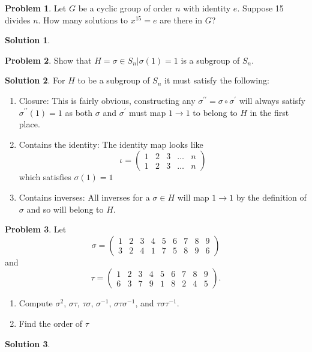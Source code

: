 \documentclass[10pt]{article}
\theoremstyle{definition}
\newtheorem{problem}{Problem}
\newtheorem{soln}{Solution}
\newcommand{\primed}[1]{#1^\prime}
\begin{document}
\begin{problem}
Let $G$ be a cyclic group of order $n$ with identity $e$. Suppose 15
divides $n$. How many solutions to $x^15=e$ are there in $G$?
\end{problem}
\begin{soln}

\end{soln}

\begin{problem}
Show that $H = {\sigma \in S_n|\sigma(1) = 1}$ is a subgroup of $S_n$.
\end{problem}
\begin{soln}
  For $H$ to be a subgroup of $S_n$ it must satisfy the following:
  \begin{enumerate}[label=(\roman*)]
    \item Closure: This is fairly obvious, constructing any $\sigma^{\prime\prime}=\sigma\circ \primed{\sigma}$
          will always satisfy $\sigma^{\prime\prime}(1)=1$ as both $\sigma$ and $\primed{\sigma}$ must map $1\to 1$ to
          belong to $H$ in the first place.
    \item Contains the identity: The identity map looks like
          $$\iota = \begin{pmatrix}
              1 & 2 & 3 & \dots & n \\
              1 & 2 & 3 & \dots & n
            \end{pmatrix}$$
          which satisfies $\sigma(1)=1$
    \item Contains inverses: All inverses for a $\sigma\in H$ will map $1\to 1$ by the definition of $\sigma$ and
          so will belong to $H$.
  \end{enumerate}
\end{soln}

\begin{problem}
Let
$$
  \sigma=\begin{pmatrix}
    1 & 2 & 3 & 4 & 5 & 6 & 7 & 8 & 9 \\
    3 & 2 & 4 & 1 & 7 & 5 & 8 & 9 & 6
  \end{pmatrix}
$$
and
$$
  \tau=\begin{pmatrix}
    1 & 2 & 3 & 4 & 5 & 6 & 7 & 8 & 9 \\
    6 & 3 & 7 & 9 & 1 & 8 & 2 & 4 & 5
  \end{pmatrix}.
$$
\begin{enumerate}[label=(\alph*)]
  \item Compute $\sigma^2$, $\sigma\tau$, $\tau\sigma$, $\sigma^{-1}$, $\sigma\tau\sigma^{-1}$, and $\tau\sigma\tau^{-1}$.
  \item Find the order of $\tau$
\end{enumerate}
\end{problem}
\begin{soln}

\end{soln}
\end{document}
